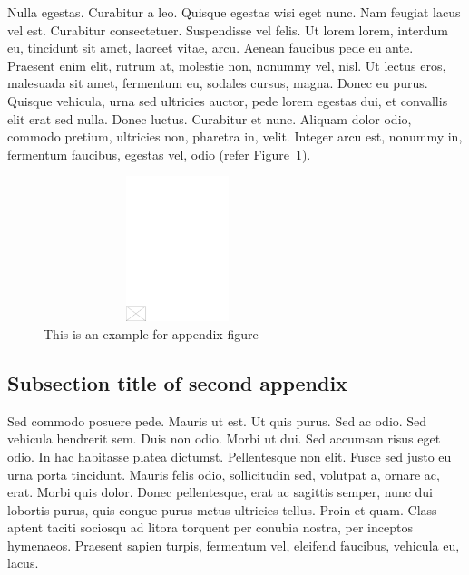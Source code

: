 \documentclass[CJCE,STIX2COL]{WileyNJD-v2}
\begin{document}
Nulla egestas. Curabitur a leo. Quisque egestas wisi eget nunc. Nam feugiat lacus vel est. Curabitur consectetuer.
Suspendisse vel felis. Ut lorem lorem, interdum eu, tincidunt sit amet, laoreet vitae, arcu. Aenean faucibus pede eu
ante. Praesent enim elit, rutrum at, molestie non, nonummy vel, nisl. Ut lectus eros, malesuada sit amet, fermentum
eu, sodales cursus, magna. Donec eu purus. Quisque vehicula, urna sed ultricies auctor, pede lorem egestas dui, et
convallis elit erat sed nulla. Donec luctus. Curabitur et nunc. Aliquam dolor odio, commodo pretium, ultricies non,
pharetra in, velit. Integer arcu est, nonummy in, fermentum faucibus, egestas vel, odio (refer Figure~\ref{fig4}).

\begin{figure}[b]
\centerline{\includegraphics[height=10pc,width=78mm,draft]{empty}}
\caption{This is an example for appendix figure\label{fig4}}
\vskip-6pt%
\end{figure}

\subsection{Subsection title of second appendix\label{app2.1a}}

Sed commodo posuere pede. Mauris ut est. Ut quis purus. Sed ac odio. Sed vehicula hendrerit sem. Duis non odio.
Morbi ut dui. Sed accumsan risus eget odio. In hac habitasse platea dictumst. Pellentesque non elit. Fusce sed justo
eu urna porta tincidunt. Mauris felis odio, sollicitudin sed, volutpat a, ornare ac, erat. Morbi quis dolor. Donec
pellentesque, erat ac sagittis semper, nunc dui lobortis purus, quis congue purus metus ultricies tellus. Proin et quam.
Class aptent taciti sociosqu ad litora torquent per conubia nostra, per inceptos hymenaeos. Praesent sapien turpis,
fermentum vel, eleifend faucibus, vehicula eu, lacus.
\end{document}
